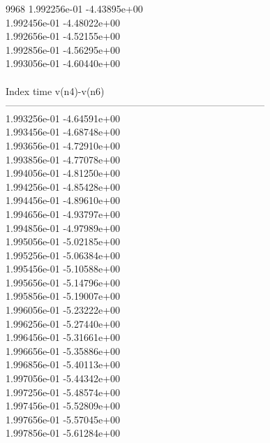 9968	1.992256e-01	-4.43895e+00	\\ 	1.992456e-01	-4.48022e+00	\\ 	1.992656e-01	-4.52155e+00	\\ 	1.992856e-01	-4.56295e+00	\\ 	1.993056e-01	-4.60440e+00	\\ \hline
\\ \hline
Index   time            v(n4)-v(n6)     \\ \hline
--------------------------------------------------------------------------------\\ 	1.993256e-01	-4.64591e+00	\\ 	1.993456e-01	-4.68748e+00	\\ 	1.993656e-01	-4.72910e+00	\\ 	1.993856e-01	-4.77078e+00	\\ 	1.994056e-01	-4.81250e+00	\\ 	1.994256e-01	-4.85428e+00	\\ 	1.994456e-01	-4.89610e+00	\\ 	1.994656e-01	-4.93797e+00	\\ 	1.994856e-01	-4.97989e+00	\\ 	1.995056e-01	-5.02185e+00	\\ 	1.995256e-01	-5.06384e+00	\\ 	1.995456e-01	-5.10588e+00	\\ 	1.995656e-01	-5.14796e+00	\\ 	1.995856e-01	-5.19007e+00	\\ 	1.996056e-01	-5.23222e+00	\\ 	1.996256e-01	-5.27440e+00	\\ 	1.996456e-01	-5.31661e+00	\\ 	1.996656e-01	-5.35886e+00	\\ 	1.996856e-01	-5.40113e+00	\\ 	1.997056e-01	-5.44342e+00	\\ 	1.997256e-01	-5.48574e+00	\\ 	1.997456e-01	-5.52809e+00	\\ 	1.997656e-01	-5.57045e+00	\\ 	1.997856e-01	-5.61284e+00	\\ \hline
